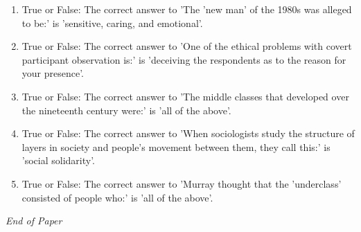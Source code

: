 \documentclass[12pt]{article}
\begin{document}
\begin{enumerate}[label=\arabic*.]
\item True or False: The correct answer to 'The 'new man' of the 1980s was alleged to be:' is 'sensitive, caring, and emotional'.
\item True or False: The correct answer to 'One of the ethical problems with covert participant observation is:' is 'deceiving the respondents as to the reason for your presence'.
\item True or False: The correct answer to 'The middle classes that developed over the nineteenth century were:' is 'all of the above'.
\item True or False: The correct answer to 'When sociologists study the structure of layers in society and people's movement between them, they call this:' is 'social solidarity'.
\item True or False: The correct answer to 'Murray thought that the 'underclass' consisted of people who:' is 'all of the above'.
\end{enumerate}

\vfill
\noindent\textit{End of Paper}
\end{document}
